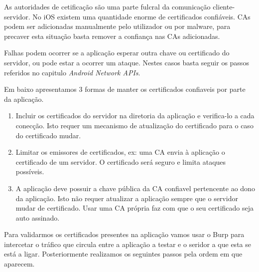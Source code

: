 As autoridades de cetificação são uma parte fulcral da comunicação cliente-servidor. No iOS existem uma quantidade enorme de certificados confiáveis. CAs podem ser adicionadas manualmente pelo utilizador ou por malware, para precaver esta situação basta  remover a confiança nas CAs adicionadas.\par
Falhas podem ocorrer se a aplicação esperar outra chave ou certificado do servidor, ou pode estar a ocorrer um ataque.
Nestes casos basta seguir os passos referidos no capitulo \textit{Android Network APIs}\cite{book}.\par
\hfill\par
Em baixo apresentamos 3 formas de manter os certificados confiaveis por parte da aplicação.
\begin{enumerate}
\item Incluir os certificados do servidor na diretoria da aplicação e verifica-lo a cada conecção. Isto requer um mecanismo de atualização do certificado para o caso do certificado mudar.\par
\hfill\par
\item Limitar os emissores de certificados, ex: uma CA envia à aplicação o certificado de um servidor. O certificado será seguro e limita ataques possíveis.\par
\hfill\par
\item A aplicação deve possuir a chave pública da CA confiavel pertencente ao dono da aplicação. Isto não requer atualizar a aplicação sempre que o servidor mudar de certificado. Usar uma CA própria faz com que o seu certificado seja auto assinado.
\end{enumerate}

Para validarmos os certificados presentes na aplicação vamos usar o Burp para intercetar o tráfico que circula entre a aplicação a testar e o seridor a que esta se está a ligar. Posteriormente realizamos os seguintes passos pela ordem em que aparecem.

